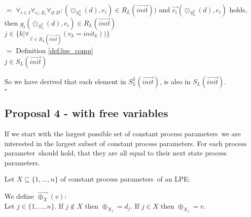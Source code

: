 \index{}\documentclass[a4paper,10pt]{article}
\theoremstyle{plain}
\theoremstyle{definition}
\newcommand{\ovr}{\overrightarrow}
\newcommand{\pp}{process parameter}
\newcommand{\pps}{process parameters}
\newcommand{\sq}{$\square$}
\begin{document}
\begin{defn}
\begin{tabbing}
\> $=$ \>  \>$ \forall_{i\in I}\forall_{e_i:E_i}\forall_{d:D} : (\odot_{S_L^3}(d),e_i) \in R_L(\ovr{init})) $ and 
$\ovr{c_i}(\odot_{S_L^3}(d),e_i)$ holds, \\
\> \> \> \> then $ g_i( \odot_{S_L^3}(d),e_i) \in R_L(\ovr{init})$ \\
\> \> $j \in \lbrace k \vert \forall_{\ovr{v} \in R_L(\ovr{init})} (v_k = init_k)) \rbrace$\\
\> $=$ \> \>Definition \ref{def:lpe_comp}\\
\> \> $j \in S_L(\ovr{init})$
\end{tabbing}

So we have derived that each element in $S_L^3(\ovr{init})$, is also in $S_L(\ovr{init})$.
\\ \sq
\end{defn}

\subsection{Proposal 4 - with free variables}

If we start with the largest possible set of constant \pps\ we are interested in the largest subset of constant \pps . For each \pp\ should hold, that they are all equal to their next state \pps.

Let $X \subseteq \lbrace 1, \ldots, n \rbrace$ of constant \pps\ of an LPE:

\begin{defn} We define $\ovr{\oplus_X}(v)$:\\
Let $j \in \lbrace 1, \dots, n \rbrace $. 
If $j \not\in X$ then $\oplus_{X_j} = d_j$. 
If $j \in X$ then $\oplus_{X_j} = v$.
\end{defn}
\end{document}
